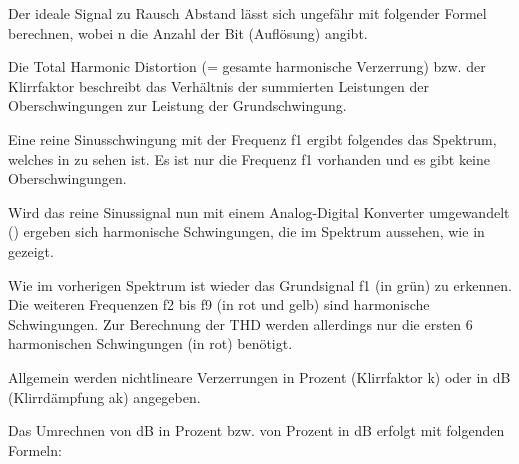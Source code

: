 
Der ideale Signal zu Rausch Abstand lässt sich ungefähr mit folgender Formel berechnen, wobei n die Anzahl der Bit (Auflösung) angibt.


Die Total Harmonic Distortion (= gesamte harmonische Verzerrung) bzw. der Klirrfaktor beschreibt das Verhältnis der summierten Leistungen der Oberschwingungen zur Leistung der Grundschwingung.


Eine reine Sinusschwingung mit der Frequenz f1 ergibt folgendes das Spektrum, welches in  zu sehen ist. Es ist nur die Frequenz f1 vorhanden und es gibt keine Oberschwingungen.



Wird das reine Sinussignal nun mit einem Analog-Digital Konverter umgewandelt () ergeben sich harmonische Schwingungen, die im Spektrum aussehen, wie in  gezeigt.


\FloatBarrier
Wie im vorherigen Spektrum ist wieder das Grundsignal f1 (in grün) zu erkennen. Die weiteren Frequenzen f2 bis f9 (in rot und gelb) sind harmonische Schwingungen. Zur Berechnung der THD werden allerdings nur die ersten 6 harmonischen Schwingungen (in rot) benötigt.

Allgemein werden nichtlineare Verzerrungen in Prozent (Klirrfaktor k) oder in dB (Klirrdämpfung ak) angegeben.


Das Umrechnen von dB in Prozent bzw. von Prozent in dB erfolgt mit folgenden Formeln:

